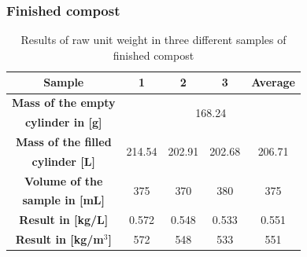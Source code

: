 \documentclass{article}
\begin{document}
\subsubsection{Finished compost}
\renewcommand{\arraystretch}{1.5}
\begin{table}[ht!]
    \centering \vspace{.3cm}
    \caption{Results of raw unit weight in three different samples of finished compost}
    \begin{tabular}{|c|c|c|c|c|}
        \hline
        \textbf{Sample} & \textbf{1} & \textbf{2} & \textbf{3} & \textbf{Average}\\
        \hline
        {\textbf{Mass of the empty}} & \multicolumn{4}{c|}{\multirow{2}{*}{168.24}}\\
        \textbf{cylinder in [g]} & \multicolumn{4}{c|}{}\\
        \hline
        \textbf{Mass of the filled} & \multirow{2}{*}{214.54} & \multirow{2}{*}{202.91} & \multirow{2}{*}{202.68} & \multirow{2}{*}{206.71}\\
        \textbf{cylinder [L]} & & & &\\
        \hline
        \textbf{Volume of the} & \multirow{2}{*}{375} & \multirow{2}{*}{370} & \multirow{2}{*}{380} & \multirow{2}{*}{375}\\
        \textbf{sample in [mL]} & & & &\\
        \hline
        \textbf{Result in [kg/L]} & 0.572 & 0.548 & 0.533 & 0.551\\
        \hline
        \textbf{Result in [kg/m$^3$]} & 572 & 548 & 533 & 551\\
        \hline
    \end{tabular}
\end{table}
\end{document}
